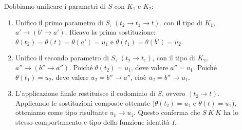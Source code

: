 Dobbiamo unificare i parametri di $S$ con $K_1$ e $K_2$:
\begin{enumerate}
    \item Unifico il primo parametro di $S$, $(t_2 \rightarrow t_1 \rightarrow t)$, con il tipo di $K_1$, $a' \rightarrow (b' \rightarrow a')$. 
    Ricavo la prima sostituzione: $\theta(t_2) = \theta(t) = \theta(a') = u_1$ e $\theta(t_1) = \theta(b') = u_2$. 
    \item Unifico il secondo parametro di $S$, $(t_2 \rightarrow t_1)$, con il tipo di $K_2$, $a'' \rightarrow (b'' \rightarrow a'')$. 
    Poiché $\theta(t_2) = u_1$, deve valere $a'' = u_1$. 
    Poiché $\theta(t_1) = u_2$, deve valere $u_2 = b'' \rightarrow a''$, cioè $u_2 = b'' \rightarrow u_1$. 
    \item L'applicazione finale restituisce il codominio di $S$, ovvero $(t_2 \rightarrow t)$. 
    Applicando le sostituzioni composte ottenute ($\theta(t_2)=u_1$ e $\theta(t)=u_1$), otteniamo come tipo risultante $u_1 \rightarrow u_1$. 
    Questo conferma che $S \ K \ K$ ha lo stesso comportamento e tipo della funzione identità $I$. 
\end{enumerate}
